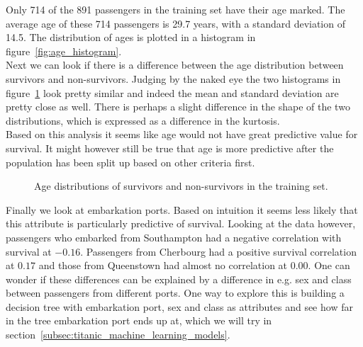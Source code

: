 \documentclass{llncs}
\begin{document}
\noindent
Only 714 of the 891 passengers in the training set have their age marked. The average age of these 714 passengers is 29.7 years, with a standard deviation of 14.5. The distribution of ages is plotted in a histogram in figure~\ref{fig:age_histogram}.\\
Next we can look if there is a difference between the age distribution between survivors and non-survivors. Judging by the naked eye the two histograms in figure~\ref{fig:survivor_split_age_histograms} look pretty similar and indeed the mean and standard deviation are pretty close as well. There is perhaps a slight difference in the shape of the two distributions, which is expressed as a difference in the kurtosis.\\
Based on this analysis it seems like age would not have great predictive value for survival. It might however still be true that age is more predictive after the population has been split up based on other criteria first.
\begin{figure}[H]
    \hfill
    \caption{Age distributions of survivors and non-survivors in the training set.}
    \label{fig:survivor_split_age_histograms}
\end{figure}
\noindent
Finally we look at embarkation ports. Based on intuition it seems less likely that this attribute is particularly predictive of survival. Looking at the data however, passengers who embarked from Southampton had a negative correlation with survival at $-0.16$. Passengers from Cherbourg had a positive survival correlation at $0.17$ and those from Queenstown had almost no correlation at $0.00$. One can wonder if these differences can be explained by a difference in e.g. sex and class between passengers from different ports. One way to explore this is building a decision tree with embarkation port, sex and class as attributes and see how far in the tree embarkation port ends up at, which we will try in section~\ref{subsec:titanic_machine_learning_models}.
\end{document}
